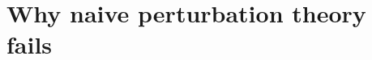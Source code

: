 \documentclass[preprint,12pt]{elsarticle}
\begin{document}
%
%
%
%
%
%
%
%


\appendix

\section{Why naive perturbation theory fails}
\label{app:naive_pt}
\end{document}

